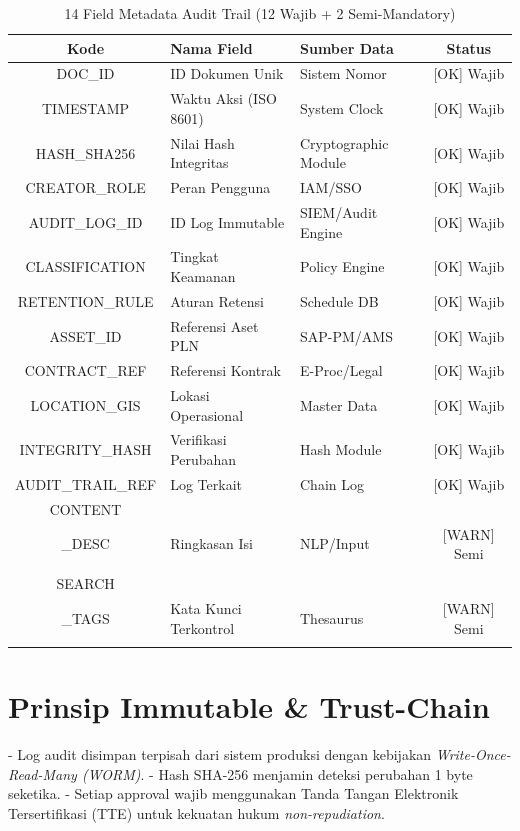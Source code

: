 \documentclass[12pt,a4paper]{report}
\begin{document}
\begin{table}[htbp]
\centering
\small
\caption{14 Field Metadata Audit Trail (12 Wajib + 2 Semi-Mandatory)}
\begin{tabularx}{\textwidth}{@{} c l l c @{}}
\toprule
\textbf{Kode} & \textbf{Nama Field} & \textbf{Sumber Data} & \textbf{Status} \\
\midrule
DOC\_ID & ID Dokumen Unik & Sistem Nomor & [OK] Wajib \\
TIMESTAMP & Waktu Aksi (ISO 8601) & System Clock & [OK] Wajib \\
HASH\_SHA256 & Nilai Hash Integritas & Cryptographic Module & [OK] Wajib \\
CREATOR\_ROLE & Peran Pengguna & IAM/SSO & [OK] Wajib \\
AUDIT\_LOG\_ID & ID Log Immutable & SIEM/Audit Engine & [OK] Wajib \\
CLASSIFICATION & Tingkat Keamanan & Policy Engine & [OK] Wajib \\
RETENTION\_RULE & Aturan Retensi & Schedule DB & [OK] Wajib \\
ASSET\_ID & Referensi Aset PLN & SAP-PM/AMS & [OK] Wajib \\
CONTRACT\_REF & Referensi Kontrak & E-Proc/Legal & [OK] Wajib \\
LOCATION\_GIS & Lokasi Operasional & Master Data & [OK] Wajib \\
INTEGRITY\_HASH & Verifikasi Perubahan & Hash Module & [OK] Wajib \\
AUDIT\_TRAIL\_REF & Log Terkait & Chain Log & [OK] Wajib \\
CONTENT\\_DESC & Ringkasan Isi & NLP/Input & [WARN] Semi \\\\
SEARCH\\_TAGS & Kata Kunci Terkontrol & Thesaurus & [WARN] Semi \\\\
\bottomrule
\end{tabularx}
\end{table}

\section{Prinsip Immutable \& Trust-Chain}
- Log audit disimpan terpisah dari sistem produksi dengan kebijakan \textit{Write-Once-Read-Many (WORM)}.
- Hash SHA-256 menjamin deteksi perubahan 1 byte seketika.
- Setiap approval wajib menggunakan Tanda Tangan Elektronik Tersertifikasi (TTE) untuk kekuatan hukum \textit{non-repudiation}.
\end{document}

